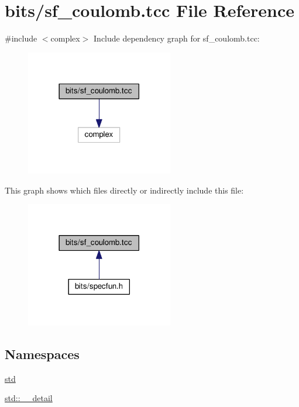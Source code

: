 \hypertarget{sf__coulomb_8tcc}{}\section{bits/sf\+\_\+coulomb.tcc File Reference}
\label{sf__coulomb_8tcc}
{\ttfamily \#include $<$complex$>$}\newline
Include dependency graph for sf\+\_\+coulomb.\+tcc\+:
\nopagebreak
\begin{figure}[H]
\begin{center}
\leavevmode
\includegraphics[width=182pt]{sf__coulomb_8tcc__incl}
\end{center}
\end{figure}
This graph shows which files directly or indirectly include this file\+:
\nopagebreak
\begin{figure}[H]
\begin{center}
\leavevmode
\includegraphics[width=182pt]{sf__coulomb_8tcc__dep__incl}
\end{center}
\end{figure}
\subsection*{Namespaces}
\begin{DoxyCompactItemize}
\item 
 \hyperlink{namespacestd}{std}
\item 
 \hyperlink{namespacestd_1_1____detail}{std\+::\+\_\+\+\_\+detail}
\end{DoxyCompactItemize}
